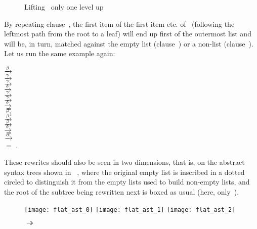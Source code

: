 \begin{figure}
\centering
{}
\qquad
{}
\caption{Lifting~ only one level up
\label{fig:flat_lifting}}
\end{figure}
By repeating clause~\clause{\eta}, the first item of the first item
etc. of~ (following the leftmost path from the root to a
leaf) will end up first of the outermost list and will be, in turn,
matched against the empty list (clause~\clause{\zeta}) or a
non\hyp{}list (clause~\clause{\theta}). Let us run the same example
again:\label{trace:flat_abc}
\begin{tabbing}
 \= \(\xrightarrow{\smash{\beta}}\) \= \\
\> \(\xrightarrow{\smash{\gamma}}\) \> \\
\> \(\xrightarrow{\smash{\gamma}}\) \> \\
\> \(\xrightarrow{\smash{\delta}}\) \> \\
\> \(\xrightarrow{\smash{\gamma}}\) \> \\
\> \(\xrightarrow{\smash{\gamma}}\) \> \\
\> \(\xrightarrow{\smash{\delta}}\) \> \\
\> \(=\)                    \> \\
\> \(\xrightarrow{\smash{\beta}}\)    \> \\
\> \(\xrightarrow{\smash{\beta}}\)  \> \\
\> \(\xrightarrow{\smash{\beta}}\)  \> \erlcode{[a,b|flat([c])]}\\
\> \(\xrightarrow{\smash{\delta}}\) \> \\
\> \(=\)                    \> \erlcode{[a,b,c|flat([])]}\\
\> \(\xrightarrow{\smash{\alpha}}\) \> \erlcode{[a,b,c|[]]}\\
\> \(=\)                    \> \erlcode{[a,b,c]}\textrm{.}
\end{tabbing}
These rewrites should also be seen in two dimensions, that is, on the
abstract syntax trees shown in
\figs~, where the original
empty list is inscribed in a dotted circled to distinguish it from the
empty lists used to build non\hyp{}empty lists, and the root of the
subtree being rewritten next is boxed as usual (here,
only~).
\begin{figure}
\centering
\texttt{[image: flat\_ast\_0]}
\texttt{[image: flat\_ast\_1]}
\texttt{[image: flat\_ast\_2]}
\caption{ \(\twoheadrightarrow\)
   \label{fig:flat_ast1}}
\end{figure}


